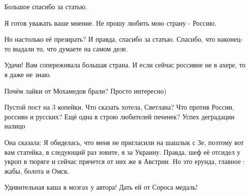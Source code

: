 \begin{itemize}
Большое спасибо за статью.

Я готов уважать ваше мнение. Не прошу любить мою страну - Россию.

Но настолько её презирать? И правда, спасибо за статью. Спасибо, что наконец-то
выдали то, что думаете на самом деле.

Удачи! Вам сопереживала большая страна. И если сейчас россияне не в ахере, то я
даже не знаю.

 
Почём лайки от Мохамедов брали?
Просто интересно)

 

Пустой пост на 3 копейки. Что сказать хотела, Светлана? Что против России,
россиян и русских? Ещё одна в строю любителей печенек? Успех деградации налицо

\begin{itemize}
 
Она сказала: Я обиделась, что меня не пригласили на шашлык с Зе, поэтому вот вам статейка, в следующий раз зовите, я за Украину.
Правда, шеф её отсидел у укроп в тюряге и сейчас прячется от них же в Австрии.
Но это ерунда, главное : жабы, болота и Омск.
\end{itemize}

 
Удивительная каша в мозгах у автора! Дать ей от Сороса медаль!

 


\end{itemize}
